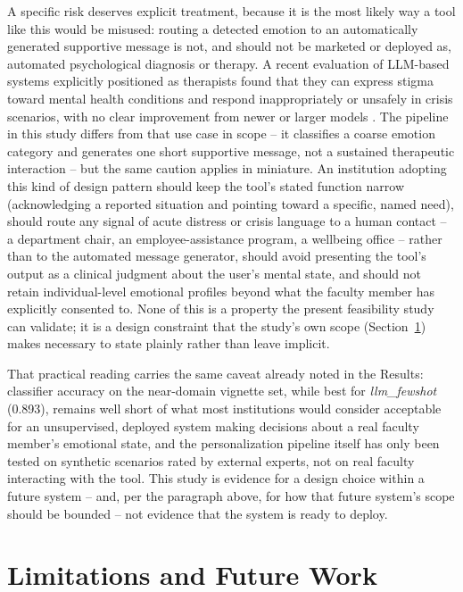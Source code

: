 \documentclass[higheredu,article,submit,pdftex,moreauthors]{Definitions/mdpi}
\begin{document}
A specific risk deserves explicit treatment, because it is the most likely way a tool like this would be misused: routing a detected emotion to an automatically generated supportive message is not, and should not be marketed or deployed as, automated psychological diagnosis or therapy. A recent evaluation of LLM-based systems explicitly positioned as therapists found that they can express stigma toward mental health conditions and respond inappropriately or unsafely in crisis scenarios, with no clear improvement from newer or larger models \cite{moore2025}. The pipeline in this study differs from that use case in scope -- it classifies a coarse emotion category and generates one short supportive message, not a sustained therapeutic interaction -- but the same caution applies in miniature. An institution adopting this kind of design pattern should keep the tool's stated function narrow (acknowledging a reported situation and pointing toward a specific, named need), should route any signal of acute distress or crisis language to a human contact -- a department chair, an employee-assistance program, a wellbeing office -- rather than to the automated message generator, should avoid presenting the tool's output as a clinical judgment about the user's mental state, and should not retain individual-level emotional profiles beyond what the faculty member has explicitly consented to. None of this is a property the present feasibility study can validate; it is a design constraint that the study's own scope (Section~\ref{sec:limitations}) makes necessary to state plainly rather than leave implicit.

That practical reading carries the same caveat already noted in the Results: classifier accuracy on the near-domain vignette set, while best for \textit{llm\_fewshot} (0.893), remains well short of what most institutions would consider acceptable for an unsupervised, deployed system making decisions about a real faculty member's emotional state, and the personalization pipeline itself has only been tested on synthetic scenarios rated by external experts, not on real faculty interacting with the tool. This study is evidence for a design choice within a future system -- and, per the paragraph above, for how that future system's scope should be bounded -- not evidence that the system is ready to deploy.

\section{Limitations and Future Work}
\label{sec:limitations}
\end{document}
